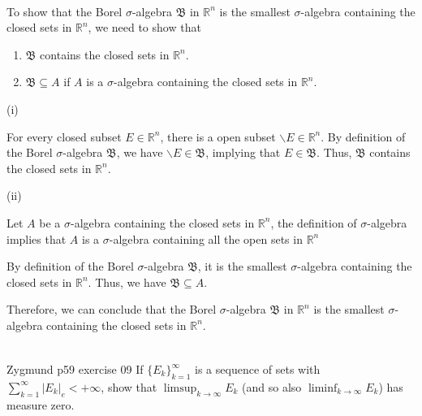 \documentclass[UTF8,a4paper,10pt]{article}
\begin{document}
  \begin{solution}\,\\

    To show that the Borel \(\sigma\)-algebra \(\mathfrak{B}\)  in \(\mathbb{R}^n\)  is the smallest \(\sigma\)-algebra containing the closed sets in \(\mathbb{R}^n\), we need to show that 

    \begin{enumerate}[label=(\roman*)]
      \item \(\mathfrak{B}\) contains the closed sets in \(\mathbb{R}^n\).
      \item \(\mathfrak{B} \subseteq A\) if \(A\) is a \(\sigma\)-algebra containing the closed sets in \(\mathbb{R}^n\).
    \end{enumerate}

(i)

For every closed subset \(E \in\mathbb{R}^n\), there is a open subset \(\backslash E \in \mathbb{R}^n\). By definition of the Borel \(\sigma\)-algebra \(\mathfrak{B}\), we have \(\backslash E \in \mathfrak{B}\), implying that \(E\in \mathfrak{B}\). Thus, \(\mathfrak{B}\) contains the closed sets in \(\mathbb{R}^n\).

(ii)

Let \(A\) be a \(\sigma\)-algebra containing the closed sets in \(\mathbb{R}^n\), the definition of \(\sigma\)-algebra implies that \(A\) is a \(\sigma\)-algebra containing all the open sets in \(\mathbb{R}^n\)

By definition of the Borel \(\sigma\)-algebra \(\mathfrak{B}\), it is the smallest \(\sigma\)-algebra containing the closed sets in \(\mathbb{R}^n\). Thus, we have \(\mathfrak{B} \subseteq A\).

Therefore, we can conclude that the Borel \(\sigma\)-algebra \(\mathfrak{B}\)  in \(\mathbb{R}^n\)  is the smallest \(\sigma\)-algebra containing the closed sets in \(\mathbb{R}^n\).



\begin{equation*}
  \begin{aligned}
  \end{aligned}
\end{equation*}


  \end{solution}

  
  \begin{Problem}[]{Zygmund p59 exercise 09}
    If \(\{E_k\}_{k=1}^{\infty}\) is a sequence of sets with \(\sum_{k=1}^{\infty}|E_k|_e<+\infty\), show that \(\limsup_{k\to\infty}E_k\)
    (and so also \(\liminf_{k\to\infty}E_k\)) has measure zero.
  \end{Problem}
\end{document}
